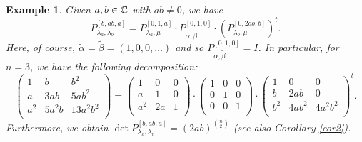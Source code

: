 \documentclass{amsart}
\newtheorem{ex}{Example}
\begin{document}
\begin{ex} {\rm  Given $a, b\in {\Bbb C}$ with $ab\neq 0$, we have 
$$P_{\lambda_a, \lambda_b}^{[b, ab, a]}=P_{\lambda_a, \mu}^{[0, 1, a]}\cdot  P_{\widetilde{\alpha}, \widetilde{\beta}}^{[0, 1, 0]} \cdot (P_{\lambda_b, \mu}^{[0, 2ab, b]})^t.$$
Here, of course, $\widetilde{\alpha}=\widetilde{\beta}=(1, 0, 0, \ldots)$ and so $P_{\widetilde{\alpha}, \widetilde{\beta}}^{[0, 1, 0]}=I$.
In particular, for $n=3$, we have the following decomposition:
\[
\begin{pmatrix}
1 & b & b^2  \\
a & 3ab & 5ab^2 \\
a^2 & 5a^2b & 13a^2b^2\\
\end{pmatrix}
=
\begin{pmatrix}
1 & 0 & 0 \\
a & 1 & 0 \\
a^2 &2a & 1 \\

\end{pmatrix}
\cdot
\begin{pmatrix}
1 & 0 & 0  \\
0 & 1 & 0  \\
0 & 0 & 1 \\
\end{pmatrix}
\cdot
\begin{pmatrix}
1 & 0 & 0 \\
b & 2ab & 0 \\
b^2 & 4ab^2 & 4a^2b^2  \\
\end{pmatrix}^t.
\]
Furthermore, we obtain $\det P_{\lambda_a, \lambda_b}^{[b, ab, a]}=(2ab)^{\binom{n}{2}}$ (see also Corollary \ref{cor2}).}
\end{ex}
\end{document}
